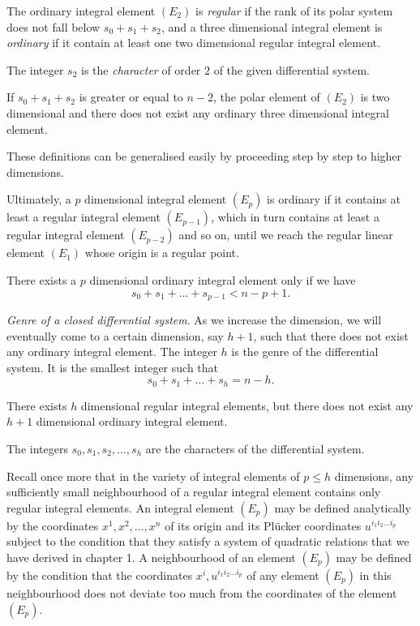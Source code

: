 \documentclass[leqno,11pt]{book}
\numberwithin{equation}{chapter}
\theoremstyle{shape1}
\theoremstyle{shape0}
\theoremstyle{shape2}
\theoremstyle{definition}
\begin{document}
The ordinary integral element $(E_{2})$ is  \emph{regular} if the rank of its polar system does not fall below $s_{0}+s_{1}+s_{2}$, and a three dimensional integral element is  \emph{ordinary} if it contain at least one two dimensional regular integral element.

The integer $s_{2}$ is the \emph{character} of order $2$ of the given differential system.

If $s_{0}+s_{1}+s_{2}$ is greater or equal to $n-2$, the polar element of $(E_{2})$ is two dimensional and there does not exist any ordinary three dimensional integral element.

These definitions can be generalised easily by proceeding step by step to higher dimensions.

Ultimately, a $p$ dimensional integral element $(E_{p})$ is ordinary if it contains at least a regular integral element $(E_{p-1})$, which in turn contains at least a regular integral element $(E_{p-2})$ and so on, until we reach the regular linear element $(E_{1})$ whose origin is a regular point.

There  exists a $p$ dimensional ordinary integral element only if we have
\[
s_{0}+s_{1}+\dots+s_{p-1}<n-p+1.
\]

\vspace{12pt}\fsec \emph{Genre of a closed differential system}. As we increase the dimension, we will eventually come to a certain dimension, say $h+1$, such that there does not exist any ordinary integral element. The integer $h$ is  the genre of the differential system. It is the smallest integer such that
\[
s_{0}+s_{1}+\dots+s_{h}=n-h.
\]

There exists $h$ dimensional regular integral elements, but there does not exist any $h+1$ dimensional ordinary integral element.

The integers $s_{0},s_{1},s_{2},\dots,s_{h}$ are the characters of the differential system.

Recall once more that in the variety of integral elements of $p\le h$ dimensions, any sufficiently small neighbourhood of a regular integral element contains only regular integral elements. An integral element $(E_{p})$ may be defined analytically by the coordinates $x^{1},x^{2},\dots,x^{n}$ of its origin and its Pl\"ucker coordinates $u^{i_{1}i_{2}\dots i_{p}}$ subject to the condition that they satisfy a system of quadratic relations that we have derived in chapter 1. A neighbourhood of an element $(E_{p})$ may be defined by the condition that the coordinates $x^{i},u^{i_{1}i_{2}\dots i_{p}}$ of any element $(E_{p})$ in this neighbourhood does not deviate too much from the coordinates of the element $(E_{p})$.
\end{document}
